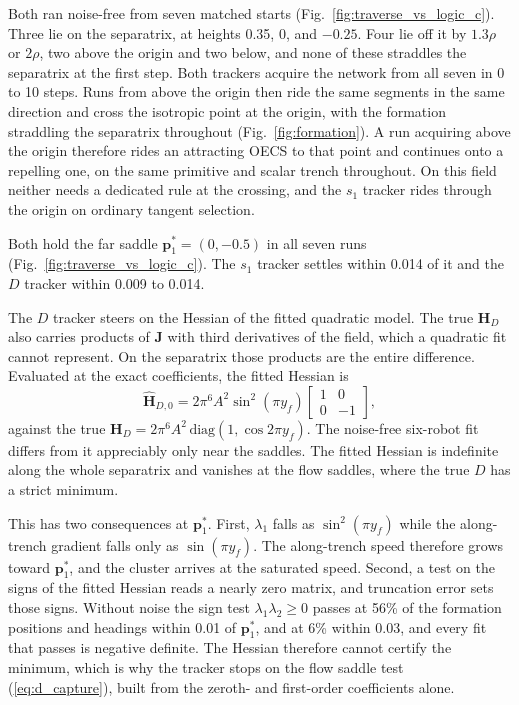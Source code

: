\documentclass[lettersize,journal]{IEEEtran}
\begin{document}
Both ran noise-free from seven matched starts
(Fig.~\ref{fig:traverse_vs_logic_c}). Three lie on the separatrix, at heights 0.35, 0, and $-0.25$. Four lie off it by $1.3\rho$ or $2\rho$, two above the origin and two below, and none of these straddles the separatrix at the first step. Both trackers acquire the network from all seven in 0 to 10 steps. Runs from above the origin then ride the same segments in the same direction and cross the isotropic point at the origin, with the formation straddling the separatrix throughout (Fig.~\ref{fig:formation}). A run
acquiring above the origin therefore rides an attracting OECS to that
point and continues onto a repelling one, on the same primitive and scalar
trench throughout. On this field neither needs a dedicated rule at the
crossing, and the $s_1$ tracker rides through the origin on ordinary
tangent selection.

Both hold the far saddle $\mathbf{p}^*_1 = (0, -0.5)$ in all seven runs
(Fig.~\ref{fig:traverse_vs_logic_c}). The $s_1$ tracker settles within
0.014 of it and the $D$ tracker within 0.009 to 0.014.

The $D$ tracker steers on the Hessian of the fitted quadratic model. The
true $\mathbf{H}_D$ also carries products of $\mathbf{J}$ with third
derivatives of the field, which a quadratic fit cannot represent. On the
separatrix those products are the entire difference. Evaluated at the exact
coefficients, the fitted Hessian is
\begin{equation}
    \hat{\mathbf{H}}_{D,0} = 2\pi^6 A^2 \sin^2(\pi y_f)
    \begin{bmatrix} 1 & 0 \\ 0 & -1 \end{bmatrix},
    \label{eq:hess_fit_sep}
\end{equation}
against the true $\mathbf{H}_D = 2\pi^6 A^2\,\mathrm{diag}(1, \cos 2\pi y_f)$.
The noise-free six-robot fit differs from it
appreciably only near the saddles. The fitted Hessian is indefinite along
the whole separatrix and vanishes at the flow saddles, where the true $D$
has a strict minimum.

This has two consequences at $\mathbf{p}^*_1$. First, $\lambda_1$ falls as
$\sin^2(\pi y_f)$ while the along-trench gradient falls only as
$\sin(\pi y_f)$. The along-trench speed therefore grows
toward $\mathbf{p}^*_1$, and the cluster arrives at the saturated speed.
Second, a test on the signs of the fitted Hessian reads a nearly zero
matrix, and truncation error sets those signs. Without noise the sign test
$\lambda_1\lambda_2 \geq 0$ passes at 56\% of the formation positions and
headings within 0.01 of $\mathbf{p}^*_1$, and at 6\% within 0.03, and
every fit that passes is negative definite. The Hessian therefore cannot
certify the minimum, which is why the tracker stops on the flow saddle
test (\ref{eq:d_capture}), built from the zeroth- and first-order
coefficients alone.
\end{document}
